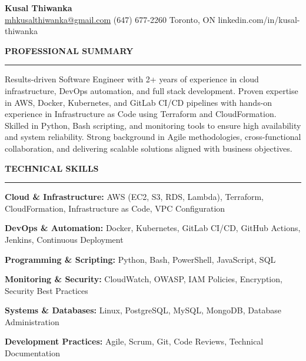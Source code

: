 \documentclass[10pt,letterpaper]{article}
\begin{document}
\begin{center}
{\LARGE\textbf{Kusal Thiwanka}}\\[3pt]
\href{mailto:mhkusalthiwanka@gmail.com}{mhkusalthiwanka@gmail.com}\hspace{2em}%
(647) 677{-}2260\hspace{2em}%
Toronto, ON\hspace{2em}
linkedin.com/in/kusal-thiwanka
\end{center}

\vspace{6pt}

\textbf{PROFESSIONAL SUMMARY}\\[-8pt]
\noindent\rule{\textwidth}{1pt}

\vspace{-2pt}

Results-driven Software Engineer with 2+ years of experience in cloud infrastructure, DevOps automation, and full stack development. Proven expertise in AWS, Docker, Kubernetes, and GitLab CI/CD pipelines with hands-on experience in Infrastructure as Code using Terraform and CloudFormation. Skilled in Python, Bash scripting, and monitoring tools to ensure high availability and system reliability. Strong background in Agile methodologies, cross-functional collaboration, and delivering scalable solutions aligned with business objectives.

\vspace{8pt}

\textbf{TECHNICAL SKILLS}\\[-8pt]
\noindent\rule{\textwidth}{1pt}

\vspace{-2pt}

\textbf{Cloud \& Infrastructure:} AWS (EC2, S3, RDS, Lambda), Terraform, CloudFormation, Infrastructure as Code, VPC Configuration

\textbf{DevOps \& Automation:} Docker, Kubernetes, GitLab CI/CD, GitHub Actions, Jenkins, Continuous Deployment

\textbf{Programming \& Scripting:} Python, Bash, PowerShell, JavaScript, SQL

\textbf{Monitoring \& Security:} CloudWatch, OWASP, IAM Policies, Encryption, Security Best Practices

\textbf{Systems \& Databases:} Linux, PostgreSQL, MySQL, MongoDB, Database Administration

\textbf{Development Practices:} Agile, Scrum, Git, Code Reviews, Technical Documentation
\end{document}
